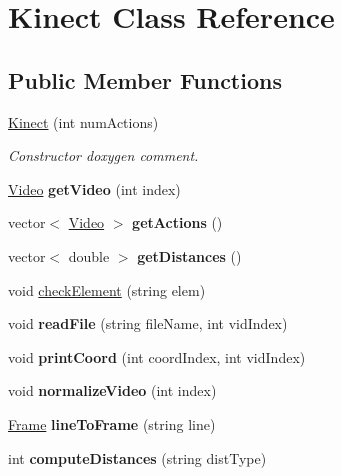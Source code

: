 \hypertarget{classKinect}{}\section{Kinect Class Reference}
\label{classKinect}
\subsection*{Public Member Functions}
\begin{DoxyCompactItemize}
\item 
\hypertarget{classKinect_a3b006be86de55984031870e9c20a41e3}{}\hyperlink{classKinect_a3b006be86de55984031870e9c20a41e3}{Kinect} (int num\+Actions)\label{classKinect_a3b006be86de55984031870e9c20a41e3}

\begin{DoxyCompactList}\small\item\em Constructor doxygen comment. \end{DoxyCompactList}\item 
\hypertarget{classKinect_ae17f3c18a613c9bba2299295934c8d49}{}\hyperlink{classVideo}{Video} {\bfseries get\+Video} (int index)\label{classKinect_ae17f3c18a613c9bba2299295934c8d49}

\item 
\hypertarget{classKinect_a1c6b1df4d48bcc309a17902dbe50c9cf}{}vector$<$ \hyperlink{classVideo}{Video} $>$ {\bfseries get\+Actions} ()\label{classKinect_a1c6b1df4d48bcc309a17902dbe50c9cf}

\item 
\hypertarget{classKinect_ab3277a16ed7f756cbe13138bd15f346e}{}vector$<$ double $>$ {\bfseries get\+Distances} ()\label{classKinect_ab3277a16ed7f756cbe13138bd15f346e}

\item 
void \hyperlink{classKinect_a01dcdd7a8db5d55f270de065f55be280}{check\+Element} (string elem)
\item 
\hypertarget{classKinect_a6cc0cc943e87a818a7e7ecf2fd38a624}{}void {\bfseries read\+File} (string file\+Name, int vid\+Index)\label{classKinect_a6cc0cc943e87a818a7e7ecf2fd38a624}

\item 
\hypertarget{classKinect_a3be2af211d73cb5f8ee12907f2216e7c}{}void {\bfseries print\+Coord} (int coord\+Index, int vid\+Index)\label{classKinect_a3be2af211d73cb5f8ee12907f2216e7c}

\item 
\hypertarget{classKinect_a8608d7982aed15a91c86b3df5272c351}{}void {\bfseries normalize\+Video} (int index)\label{classKinect_a8608d7982aed15a91c86b3df5272c351}

\item 
\hypertarget{classKinect_a8e7b90783d748e74fd96e46c98eb568f}{}\hyperlink{classFrame}{Frame} {\bfseries line\+To\+Frame} (string line)\label{classKinect_a8e7b90783d748e74fd96e46c98eb568f}

\item 
\hypertarget{classKinect_a521497bee30e5178f376cce51fa5907f}{}int {\bfseries compute\+Distances} (string dist\+Type)\label{classKinect_a521497bee30e5178f376cce51fa5907f}

\end{DoxyCompactItemize}


